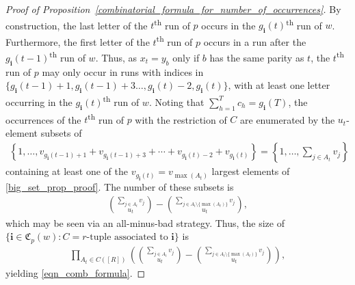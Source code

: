 \documentclass[10pt,a4paper]{amsart}
\begin{document}
\begin{proof}[Proof of Proposition~\ref{combinatorial_formula_for_number_of_occurrences}]
    
    By construction, the last letter of the $t$\textsuperscript{th} run of $p$ occurs in the $g_{\mathbf{i}}(t)$\textsuperscript{th} run of $w$. Furthermore, the first letter of the $t$\textsuperscript{th} run of $p$ occurs in a run after the $g_{\mathbf{i}}(t-1)$\textsuperscript{th} run of $w$. Thus, as $x_t=y_b$ only if $b$ has the same parity as $t$, the $t$\textsuperscript{th} run of $p$ may only occur in runs with indices in $\{g_{\mathbf{i}}(t-1)+1,g_{\mathbf{i}}(t-1)+3\dots,g_{\mathbf{i}}(t)-2,g_{\mathbf{i}}(t)\}$, with at least one letter occurring in the $g_{\mathbf{i}}(t)$\textsuperscript{th} run of $w$. Noting that $\sum_{h=1}^{T}c_h=g_{\mathbf{i}}(T)$, the occurrences of the $t$\textsuperscript{th} run of $p$ with the restriction of $C$ are enumerated by the $u_t$-element subsets of
    \begin{align}\label{big_set_prop_proof}
        \left\{1,\dots,v_{g_{\mathbf{i}}(t-1)+1}+v_{g_{\mathbf{i}}(t-1)+3}+\cdots+v_{g_{\mathbf{i}}(t)-2}+v_{g_{\mathbf{i}}(t)}\right\}=\left\{1,\dots,\sum_{j\in A_t} v_j\right\}
    \end{align}
    containing at least one of the $v_{g_{\mathbf{i}}(t)}=v_{\max(A_t)}$ largest elements of \eqref{big_set_prop_proof}. The number of these subsets is
    \begin{align*}
        {\sum_{j\in A_t}v_{j}\choose u_t}-{\sum_{j\in A_t\setminus\{\max(A_t)\}}v_{j}\choose u_t},
    \end{align*}
    which may be seen via an all-minus-bad strategy. Thus, the size of $\{\mathbf{i}\in\mathfrak{C}_{p}(w):C=r\text{-tuple~associated~to~}\mathbf{i}\}$ is
    \begin{align}\label{complicated_summand}
        \prod_{A_t\in C([R])}\left({\sum_{j\in A_t}v_{j}\choose u_t}-{\sum_{j\in A_t\setminus\{\max(A_t)\}}v_{j}\choose u_t}\right),
    \end{align}
    yielding \eqref{eqn_comb_formula}.
\end{proof}
\end{document}
